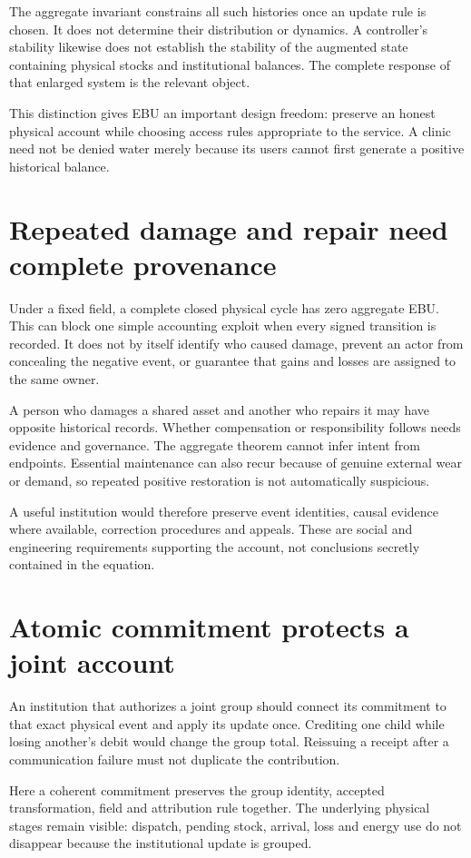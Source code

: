 The aggregate invariant constrains all such histories once an update rule is chosen. It does not determine their distribution or dynamics. A controller's stability likewise does not establish the stability of the augmented state containing physical stocks and institutional balances. The complete response of that enlarged system is the relevant object.

This distinction gives EBU an important design freedom: preserve an honest physical account while choosing access rules appropriate to the service. A clinic need not be denied water merely because its users cannot first generate a positive historical balance.

\section{Repeated damage and repair need complete provenance}
Under a fixed field, a complete closed physical cycle has zero aggregate EBU. This can block one simple accounting exploit when every signed transition is recorded. It does not by itself identify who caused damage, prevent an actor from concealing the negative event, or guarantee that gains and losses are assigned to the same owner.

A person who damages a shared asset and another who repairs it may have opposite historical records. Whether compensation or responsibility follows needs evidence and governance. The aggregate theorem cannot infer intent from endpoints. Essential maintenance can also recur because of genuine external wear or demand, so repeated positive restoration is not automatically suspicious.

A useful institution would therefore preserve event identities, causal evidence where available, correction procedures and appeals. These are social and engineering requirements supporting the account, not conclusions secretly contained in the equation.

\section{Atomic commitment protects a joint account}
An institution that authorizes a joint group should connect its commitment to that exact physical event and apply its update once. Crediting one child while losing another's debit would change the group total. Reissuing a receipt after a communication failure must not duplicate the contribution.

Here a coherent commitment preserves the group identity, accepted transformation, field and attribution rule together. The underlying physical stages remain visible: dispatch, pending stock, arrival, loss and energy use do not disappear because the institutional update is grouped.

